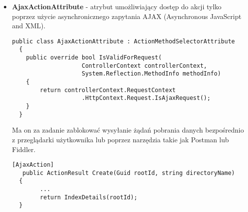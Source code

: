 \begin{itemize}
  \item \textbf{AjaxActionAttribute} - atrybut umożliwiający dostęp do akcji tylko poprzez użycie asynchronicznego zapytania AJAX (Asynchronous JavaScript and XML).
   \\
  \begin{lstlisting}[caption=Kod atrybutu Automap]
  public class AjaxActionAttribute : ActionMethodSelectorAttribute
  {
  	public override bool IsValidForRequest(
				  	ControllerContext controllerContext, 
				  	System.Reflection.MethodInfo methodInfo)
  	{
  		return controllerContext.RequestContext
  					.HttpContext.Request.IsAjaxRequest();
  	}
  }
   \end{lstlisting}
  Ma on za zadanie zablokować wysyłanie żądań pobrania danych bezpośrednio z przeglądarki użytkownika lub poprzez narzędzia takie jak Postman lub Fiddler.
  \\
  \begin{lstlisting}[caption=Wykorzystanie atrybutu AjaxAction]
  [AjaxAction]
   public ActionResult Create(Guid rootId, string directoryName)
  {
 		...
  		return IndexDetails(rootId);  	
  }
  

\end{lstlisting}
\end{itemize}
